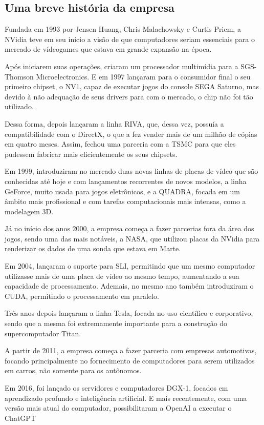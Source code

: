 \documentclass[conference]{IEEEtran}
\begin{document}
\subsection{Uma breve história da empresa}
\par Fundada em 1993 por Jensen Huang, Chris Malachowsky e Curtis Priem, a NVidia teve em seu início a visão de que computadores seriam essenciais para o mercado de vídeogames que estava em grande expansão na época.
\par Após iniciarem suas operações, criaram um processador multimídia para a SGS-Thomson Microelectronics. E em 1997 lançaram para o consumidor final o seu primeiro chipset, o NV1, capaz de executar jogos do console SEGA Saturno, mas devido à não adequação de seus drivers para com o mercado, o chip não foi tão utilizado.
\par Dessa forma, depois lançaram a linha RIVA, que, dessa vez, possuía a compatibilidade com o DirectX, o que a fez vender mais de um milhão de cópias em quatro meses. Assim, fechou uma parceria com a TSMC para que eles pudessem fabricar mais eficientemente os seus chipsets.
\par Em 1999, introduziram no mercado duas novas linhas de placas de vídeo que são conhecidas até hoje e com lançamentos recorrentes de novos modelos, a linha GeForce, muito usada para jogos eletrônicos, e a QUADRA, focada em um âmbito mais profissional e com tarefas computacionais mais intensas, como a modelagem 3D.
\par Já no início dos anos 2000, a empresa começa a fazer parcerias fora da área dos jogos, sendo uma das mais notáveis, a NASA, que utilizou placas da NVidia para renderizar os dados de uma sonda que estava em Marte.
\par Em 2004, lançaram o suporte para SLI, permitindo que um mesmo computador utilizasse mais de uma placa de vídeo ao mesmo tempo, aumentando a sua capacidade de processamento. Ademais, no mesmo ano também introduziram o CUDA, permitindo o processamento em paralelo.
\par Três anos depois lançaram a linha Tesla, focada no uso científico e corporativo, sendo que a mesma foi extremamente importante para a construção do supercomputador Titan.
\par A partir de 2011, a empresa começa a fazer parceria com empresas automotivas, focando principalmente no fornecimento de computadores para serem utilizados em carros, não somente para os autônomos.
\par Em 2016, foi lançado os servidores e computadores DGX-1, focados em aprendizado profundo e inteligência artificial. E mais recentemente, com uma versão mais atual do computador, possibilitaram a OpenAI a executar o ChatGPT
\end{document}
